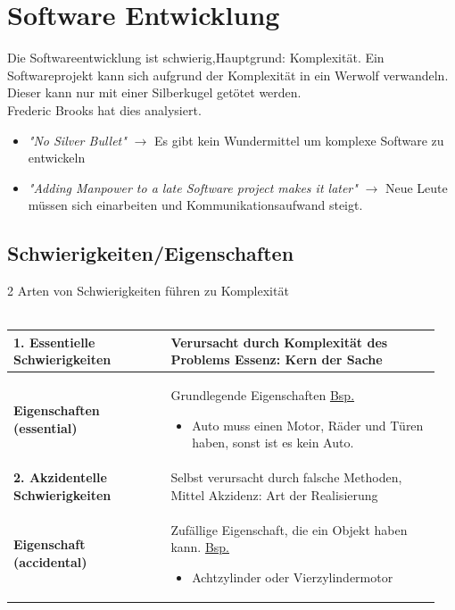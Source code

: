 \section{Software Entwicklung}
\begin{figure}
\end{figure}
Die Softwareentwicklung ist schwierig,Hauptgrund: Komplexität.  
Ein Softwareprojekt kann sich aufgrund der Komplexität in ein Werwolf verwandeln. Dieser kann nur mit einer Silberkugel getötet werden.\\
Frederic Brooks hat dies analysiert. \\

\begin{itemize}
	\item \textit{"No Silver Bullet"} $\rightarrow$ Es gibt kein Wundermittel um komplexe Software zu entwickeln
	\item \textit{"{}Adding Manpower to a late Software project makes it later"}\newline
    $\rightarrow$ Neue Leute müssen sich einarbeiten und Kommunikationsaufwand steigt. 
\end{itemize}

\subsection{Schwierigkeiten/Eigenschaften}
2 Arten von Schwierigkeiten führen zu Komplexität\\ \\
\begin{tabular}{|p{0.35\linewidth}|p{0.6\linewidth}|}
	\hline
	\textbf{1. Essentielle Schwierigkeiten} & Verursacht durch Komplexität des Problems \newline Essenz: Kern der Sache
    \\ \hline
   	\quad\textbf{Eigenschaften (essential)} & Grundlegende Eigenschaften \newline \underline{Bsp.} 
    \begin{itemize}
        \item Auto muss einen Motor, Räder und Türen haben, sonst ist es kein Auto.
    \end{itemize}
    \\ \hline \hline
    
	\textbf{2. Akzidentelle Schwierigkeiten} & Selbst verursacht durch falsche Methoden, Mittel \newline Akzidenz: Art der Realisierung
    \\ \hline

	\quad \textbf{Eigenschaft (accidental)} & Zufällige Eigenschaft, die ein Objekt haben kann. \newline \underline{Bsp.} 
	\begin{itemize}
	\item Achtzylinder oder Vierzylindermotor
	\end{itemize} \\ \hline
\end{tabular}
